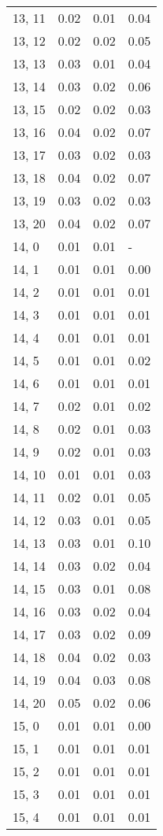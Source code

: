 \begin{table}
\begin{tabular}{llll}
13, 11 &  0.02 &  0.01 &  0.04 \\
13, 12 &  0.02 &  0.02 &  0.05 \\
13, 13 &  0.03 &  0.01 &  0.04 \\
13, 14 &  0.03 &  0.02 &  0.06 \\
13, 15 &  0.02 &  0.02 &  0.03 \\
13, 16 &  0.04 &  0.02 &  0.07 \\
13, 17 &  0.03 &  0.02 &  0.03 \\
13, 18 &  0.04 &  0.02 &  0.07 \\
13, 19 &  0.03 &  0.02 &  0.03 \\
13, 20 &  0.04 &  0.02 &  0.07 \\
14, 0  &  0.01 &  0.01 &     - \\
14, 1  &  0.01 &  0.01 &  0.00 \\
14, 2  &  0.01 &  0.01 &  0.01 \\
14, 3  &  0.01 &  0.01 &  0.01 \\
14, 4  &  0.01 &  0.01 &  0.01 \\
14, 5  &  0.01 &  0.01 &  0.02 \\
14, 6  &  0.01 &  0.01 &  0.01 \\
14, 7  &  0.02 &  0.01 &  0.02 \\
14, 8  &  0.02 &  0.01 &  0.03 \\
14, 9  &  0.02 &  0.01 &  0.03 \\
14, 10 &  0.01 &  0.01 &  0.03 \\
14, 11 &  0.02 &  0.01 &  0.05 \\
14, 12 &  0.03 &  0.01 &  0.05 \\
14, 13 &  0.03 &  0.01 &  0.10 \\
14, 14 &  0.03 &  0.02 &  0.04 \\
14, 15 &  0.03 &  0.01 &  0.08 \\
14, 16 &  0.03 &  0.02 &  0.04 \\
14, 17 &  0.03 &  0.02 &  0.09 \\
14, 18 &  0.04 &  0.02 &  0.03 \\
14, 19 &  0.04 &  0.03 &  0.08 \\
14, 20 &  0.05 &  0.02 &  0.06 \\
15, 0  &  0.01 &  0.01 &  0.00 \\
15, 1  &  0.01 &  0.01 &  0.01 \\
15, 2  &  0.01 &  0.01 &  0.01 \\
15, 3  &  0.01 &  0.01 &  0.01 \\
15, 4  &  0.01 &  0.01 &  0.01 \\

\end{tabular}
\end{table}
